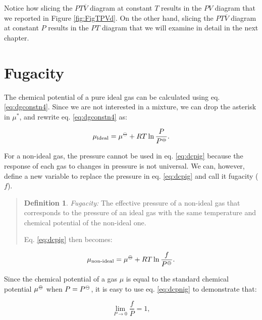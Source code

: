 \documentclass[
  9pt,
]{extbook}
\theoremstyle{definition}
\newtheorem{definition}{Definition}[chapter]
\theoremstyle{definition}
\theoremstyle{definition}
\theoremstyle{definition}
\theoremstyle{remark}
\begin{document}
Notice how slicing the \(PT\overline{V}\) diagram at constant \(T\) results in the \(PV\) diagram that we reported in Figure \ref{fig:FigTPVd}. On the other hand, slicing the \(PT\overline{V}\) diagram at constant \(P\) results in the \(PT\) diagram that we will examine in detail in the next chapter.

\section{Fugacity}\label{fugacity}

The chemical potential of a pure ideal gas can be calculated using eq. \eqref{eq:dgconstn4}. Since we are not interested in a mixture, we can drop the asterisk in \(\mu^*\), and rewrite eq. \eqref{eq:dgconstn4} as:

\begin{equation}
\mu_{\text{ideal}} = \mu^{-\kern-6pt{\ominus}\kern-6pt-}+ RT \ln \frac{P}{P^{-\kern-6pt{\ominus}\kern-6pt-}}.
\label{eq:dcpig}
\end{equation}

For a non-ideal gas, the pressure cannot be used in eq. \eqref{eq:dcpig} because the response of each gas to changes in pressure is not universal. We can, however, define a new variable to replace the pressure in eq. \eqref{eq:dcpig} and call it fugacity (\(f\)).

\begin{quote}
\begin{definition}
\protect\hypertarget{def:fugacitydef}{}\label{def:fugacitydef}\emph{Fugacity:} The effective pressure of a non-ideal gas that corresponds to the pressure of an ideal gas with the same temperature and chemical potential of the non-ideal one.
\end{definition}

Eq. \eqref{eq:dcpig} then becomes:
\end{quote}

\begin{equation}
\mu_{\text{non-ideal}} = \mu^{-\kern-6pt{\ominus}\kern-6pt-}+ RT \ln \frac{f}{P^{-\kern-6pt{\ominus}\kern-6pt-}}.
\label{eq:dcpnig}
\end{equation}

Since the chemical potential of a gas \(\mu\) is equal to the standard chemical potential \(\mu^{-\kern-6pt{\ominus}\kern-6pt-}\) when \(P=P^{-\kern-6pt{\ominus}\kern-6pt-}\), it is easy to use eq. \eqref{eq:dcpnig} to demonstrate that:

\begin{equation}
\lim_{P\rightarrow 0} \frac{f}{P} = 1,
\label{eq:dcpnigL}
\end{equation}
\end{document}
